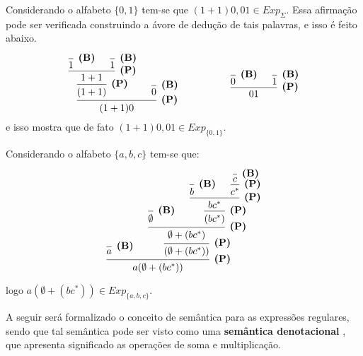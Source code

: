\begin{exemplo}
	Considerando o alfabeto $\{0,1\}$ tem-se que $(1 + 1)0, 01 \in Exp_\Sigma$. Essa afirmação pode ser verificada construindo a ávore de dedução de tais palavras, e isso é feito abaixo.

	\[
	\begin{prooftree}
		\hypo{ }
		\infer1[\textbf{(B)}]{ 1 }
		\hypo{ }
		\infer1[\textbf{(B)}]{ 1 }
		\infer2[\textbf{(P)}]{ 1 + 1 }
		\infer1[\textbf{(P)}]{ (1 + 1) }
		\hypo{ }
		\infer1[\textbf{(B)}]{ 0 }
		\infer2[\textbf{(P)}]{ (1 + 1)0 }
	\end{prooftree}
	\quad 
	\ \ \ \ \ \ \ \ \ \
	\quad 
	\begin{prooftree}
		\hypo{ }
		\infer1[\textbf{(B)}]{ 0 }
		\hypo{ }
		\infer1[\textbf{(B)}]{ 1 }
		\infer2[\textbf{(P)}]{ 01 }
	\end{prooftree}
	\]
	e isso mostra que de fato $(1 + 1)0, 01 \in Exp_{\{0,1\}}$.
\end{exemplo}

\begin{exemplo}
	Considerando o alfabeto $\{a, b, c\}$ tem-se que:

	\[
		\begin{prooftree}
			\hypo{ }
			\infer1[\textbf{(B)}]{ a }
			\hypo{ }
			\infer1[\textbf{(B)}]{ \emptyset }
			\hypo{ }
			\infer1[\textbf{(B)}]{ b }
			\hypo{ }
			\infer1[\textbf{(B)}]{ c }
			\infer1[\textbf{(P)}]{ c^* }
			\infer2[\textbf{(P)}]{ bc^* }
			\infer1[\textbf{(P)}]{ (bc^*) }
			\infer2[\textbf{(P)}]{ \emptyset + (bc^*) }
			\infer1[\textbf{(P)}]{ (\emptyset + (bc^*)) }
			\infer2[\textbf{(P)}]{ a(\emptyset + (bc^*)) }
		\end{prooftree}
	\]

	logo $a(\emptyset + (bc^*)) \in Exp_{\{a, b, c\}}$.
\end{exemplo}

A seguir será formalizado o conceito de semântica para as expressões regulares, sendo que tal semântica pode ser visto como uma \textbf{semântica denotacional} \cite{scott1971}, que apresenta significado as operações de soma e multiplicação.